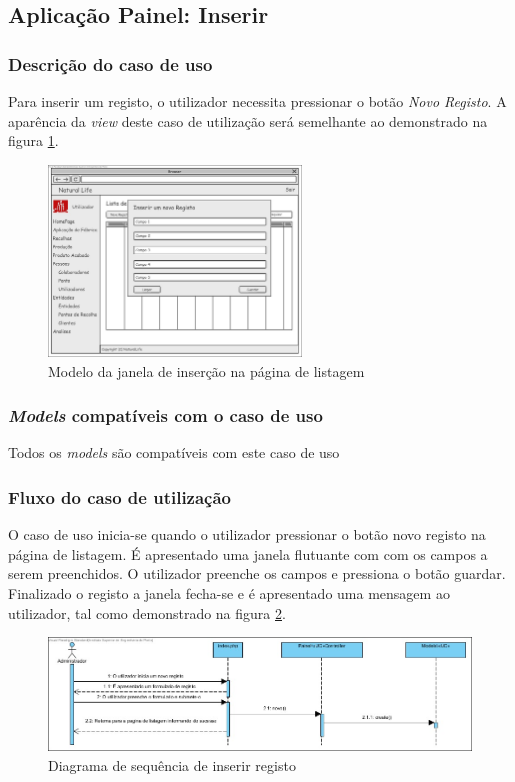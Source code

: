 \subsection{Aplicação Painel: Inserir}
\subsubsection*{Descrição do caso de uso}
Para inserir um registo, o utilizador necessita pressionar o botão \textit{Novo Registo}. A aparência da \textit{view} deste caso de utilização será semelhante ao demonstrado na figura \ref{fig:di_novo}. 

\begin{figure}[H] 
	\begin{center}
		\includegraphics[width=0.60\textwidth,keepaspectratio]{figuras/Diagramas_vp/DI_Painel_2_Inserir.jpg}
		\caption{Modelo da janela de inserção na página de listagem}
		\label{fig:di_novo} 
	\end{center}
\end{figure}

\subsubsection*{\textit{Models} compatíveis com o caso de uso}
Todos os \textit{models} são compatíveis com este caso de uso

\subsubsection*{Fluxo do caso de utilização}
O caso de uso inicia-se quando o utilizador pressionar o botão novo registo na página de listagem. É apresentado uma janela flutuante com com os campos a serem preenchidos. O utilizador preenche os campos e pressiona o botão guardar. Finalizado o registo a janela fecha-se e é apresentado uma mensagem ao utilizador, tal como demonstrado na figura \ref{fig:sd_novo}.


\begin{figure}[H] 
	\begin{center}
		\includegraphics[width=\textwidth,keepaspectratio]{figuras/Diagramas_vp/SD_Painel_2_Inserir.jpg}
		\caption{Diagrama de sequência de inserir registo}
		\label{fig:sd_novo} 
	\end{center}
\end{figure}